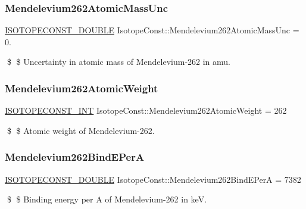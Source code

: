 \subsubsection{\texorpdfstring{Mendelevium262\+Atomic\+Mass\+Unc}{Mendelevium262AtomicMassUnc}}
{\footnotesize\ttfamily \mbox{\hyperlink{group___isotope_const-_macros_ga8f45a7272ce02c0b4c65c44636ed719a}{I\+S\+O\+T\+O\+P\+E\+C\+O\+N\+S\+T\+\_\+\+D\+O\+U\+B\+LE}} Isotope\+Const\+::\+Mendelevium262\+Atomic\+Mass\+Unc = 0.}

\$ \$ Uncertainty in atomic mass of Mendelevium-\/262 in amu. \mbox{\label{group___isotope_const-_mendelevium-_md262_gaab5106c512e5220829ceb5e3faf01611}} 
\subsubsection{\texorpdfstring{Mendelevium262\+Atomic\+Weight}{Mendelevium262AtomicWeight}}
{\footnotesize\ttfamily \mbox{\hyperlink{group___isotope_const-_macros_ga5f18360b3e99483a35c32d789e62621c}{I\+S\+O\+T\+O\+P\+E\+C\+O\+N\+S\+T\+\_\+\+I\+NT}} Isotope\+Const\+::\+Mendelevium262\+Atomic\+Weight = 262}

\$ \$ Atomic weight of Mendelevium-\/262. \mbox{\label{group___isotope_const-_mendelevium-_md262_ga56dba62a6af5a0e2772124f5339c9a00}} 
\subsubsection{\texorpdfstring{Mendelevium262\+Bind\+E\+PerA}{Mendelevium262BindEPerA}}
{\footnotesize\ttfamily \mbox{\hyperlink{group___isotope_const-_macros_ga8f45a7272ce02c0b4c65c44636ed719a}{I\+S\+O\+T\+O\+P\+E\+C\+O\+N\+S\+T\+\_\+\+D\+O\+U\+B\+LE}} Isotope\+Const\+::\+Mendelevium262\+Bind\+E\+PerA = 7382}

\$ \$ Binding energy per A of Mendelevium-\/262 in keV. \mbox{\label{group___isotope_const-_mendelevium-_md262_ga7e0396f87ef08311f7b362aa03a0de8d}} 
